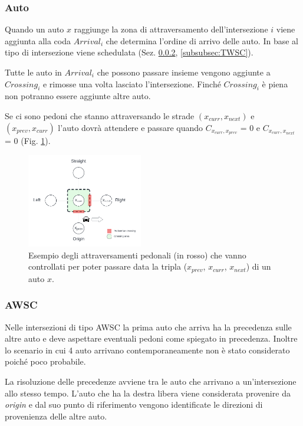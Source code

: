 \subsubsection{Auto}
Quando un auto $x$ raggiunge la zona di attraversamento dell'intersezione $i$ viene aggiunta alla coda $\textit{Arrival}_i$ che
determina l'ordine di arrivo delle auto. In base al tipo di intersezione viene schedulata (Sez. \ref{subsubsec:AWSC}, \ref{subsubsec:TWSC}). 

Tutte le auto in $\textit{Arrival}_i$ che possono passare insieme vengono aggiunte a $\textit{Crossing}_i$ e rimosse una volta lasciato l'intersezione.
Finché $\textit{Crossing}_i$ è piena non potranno essere aggiunte altre auto.

%
Se ci sono pedoni che stanno attraversando le strade $(x_{curr}, x_{next})$ e $(x_{prev}, x_{curr})$ l'auto dovrà attendere 
e passare quando $C_{x_{curr},x_{prev}}$ = 0 e $C_{x_{curr},x_{next}}$ = 0 (Fig. \ref{fig:auto-ped-crossing}).

\begin{figure}[ht]
    \centering
    \includegraphics[width=0.45\textwidth]{images/crossing_auto_ped_crossing}
    \caption{Esempio degli attraversamenti pedonali (in rosso) che vanno controllati
        per poter passare data la tripla ($x_{prev}$, $x_{curr}$, $x_{next}$) di un auto $x$.}
    \label{fig:auto-ped-crossing}
\end{figure}

\subsubsection{AWSC}
\label{subsubsec:AWSC}
Nelle intersezioni di tipo AWSC la prima auto che arriva ha la precedenza sulle altre auto e deve aspettare eventuali pedoni come spiegato in precedenza.
Inoltre lo scenario in cui 4 auto arrivano contemporaneamente non è stato considerato poiché poco probabile.

La risoluzione delle precedenze avviene tra le auto che arrivano a un'intersezione allo stesso tempo.
L'auto che ha la destra libera viene considerata provenire da \textit{origin} e dal suo punto di riferimento
vengono identificate le direzioni di provenienza delle altre auto.

